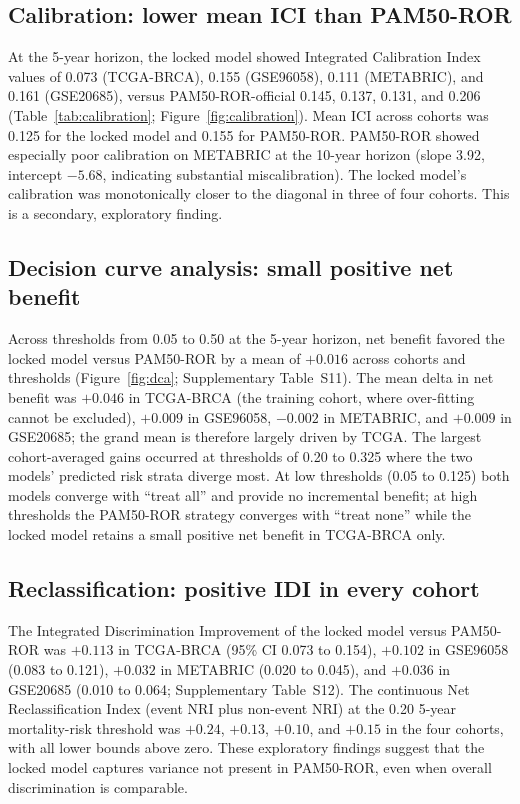 \documentclass[11pt,letterpaper]{article}
\begin{document}
\subsection*{Calibration: lower mean ICI than PAM50-ROR}

At the 5-year horizon, the locked model showed Integrated Calibration Index values of 0.073 (TCGA-BRCA), 0.155 (GSE96058), 0.111 (METABRIC), and 0.161 (GSE20685), versus PAM50-ROR-official 0.145, 0.137, 0.131, and 0.206 (Table~\ref{tab:calibration}; Figure~\ref{fig:calibration}). Mean ICI across cohorts was 0.125 for the locked model and 0.155 for PAM50-ROR. PAM50-ROR showed especially poor calibration on METABRIC at the 10-year horizon (slope 3.92, intercept $-5.68$, indicating substantial miscalibration). The locked model's calibration was monotonically closer to the diagonal in three of four cohorts. This is a secondary, exploratory finding.

\subsection*{Decision curve analysis: small positive net benefit}

Across thresholds from 0.05 to 0.50 at the 5-year horizon, net benefit favored the locked model versus PAM50-ROR by a mean of $+0.016$ across cohorts and thresholds (Figure~\ref{fig:dca}; Supplementary Table~S11). The mean delta in net benefit was $+0.046$ in TCGA-BRCA (the training cohort, where over-fitting cannot be excluded), $+0.009$ in GSE96058, $-0.002$ in METABRIC, and $+0.009$ in GSE20685; the grand mean is therefore largely driven by TCGA. The largest cohort-averaged gains occurred at thresholds of 0.20 to 0.325 where the two models' predicted risk strata diverge most. At low thresholds (0.05 to 0.125) both models converge with ``treat all'' and provide no incremental benefit; at high thresholds the PAM50-ROR strategy converges with ``treat none'' while the locked model retains a small positive net benefit in TCGA-BRCA only.

\subsection*{Reclassification: positive IDI in every cohort}

The Integrated Discrimination Improvement of the locked model versus PAM50-ROR was $+0.113$ in TCGA-BRCA (95\% CI 0.073 to 0.154), $+0.102$ in GSE96058 (0.083 to 0.121), $+0.032$ in METABRIC (0.020 to 0.045), and $+0.036$ in GSE20685 (0.010 to 0.064; Supplementary Table~S12). The continuous Net Reclassification Index (event NRI plus non-event NRI) at the 0.20 5-year mortality-risk threshold was $+0.24$, $+0.13$, $+0.10$, and $+0.15$ in the four cohorts, with all lower bounds above zero. These exploratory findings suggest that the locked model captures variance not present in PAM50-ROR, even when overall discrimination is comparable.
\end{document}
